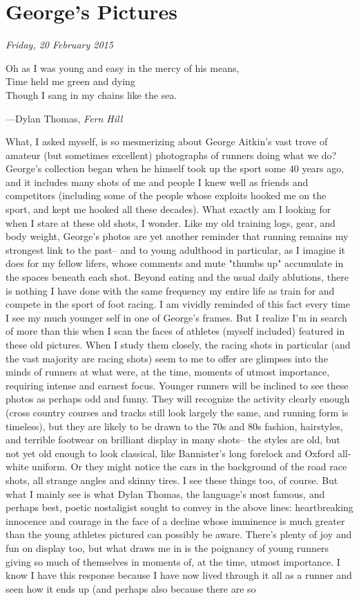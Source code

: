 \chapter{George's Pictures}
\textit{Friday, 20 February 2015}
\bigskip


\epigraph{Oh as I was young and easy in the mercy of his means, \\ Time held me green and dying \\Though I sang in my chains like the sea.}{---Dylan Thomas, 
\textit{Fern Hill}}

What, I asked myself, is so mesmerizing about George Aitkin's vast trove of amateur (but sometimes excellent) photographs of runners doing what we do? George's collection began when he himself took up the sport some 40 years ago, and it includes many shots of me and people I knew well as friends and competitors (including some of the people whose exploits hooked me on the sport, and kept me hooked all these decades). What exactly am I looking for when I stare at these old shots, I wonder. Like my old training logs, gear, and body weight, George's photos are yet another reminder that running remains my strongest link to the past-- and to young adulthood in particular, as I imagine it does for my fellow lifers, whose comments and mute "thumbs up" accumulate in the spaces beneath each shot. Beyond eating and the usual daily ablutions, there is nothing I have done with the same frequency my entire life as train for and compete in the sport of foot racing. I am vividly reminded of this fact every time I see my much younger self in one of George's frames. But I realize I'm in search of more than this when I scan the faces of athletes (myself included) featured in these old pictures. When I study them closely, the racing shots in particular (and the vast majority are racing shots) seem to me to offer are glimpses into the minds of runners at what were, at the time, moments of utmost importance, requiring intense and earnest focus. Younger runners will be inclined to see these photos as perhaps odd and funny. They will recognize the activity clearly enough (cross country courses and tracks still look largely the same, and running form is timeless), but they are likely to be drawn to the 70s and 80s fashion, hairstyles, and terrible footwear on brilliant display in many shots-- the styles are old, but not yet old enough to look classical, like Bannister's long forelock and Oxford all-white uniform. Or they might notice the cars in the background of the road race shots, all strange angles and skinny tires. I see these things too, of course. But what I mainly see is what Dylan Thomas, the language's most famous, and perhaps best, poetic nostaligist sought to convey in the above lines: heartbreaking innocence and courage in the face of a decline whose imminence is much greater than the young athletes pictured can possibly be aware. There's plenty of joy and fun on display too, but what draws me in is the poignancy of young runners giving so much of themselves in moments of, at the time, utmost importance. I know I have this response because I have now lived through it all as a runner and seen how it ends up (and perhaps also because there are so 
